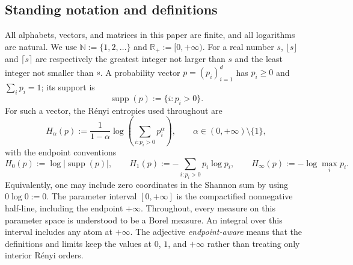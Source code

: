 \documentclass[aps,pra,11pt,onecolumn,nofootinbib,tightenlines]{revtex4-2}
\theoremstyle{definition}
\begin{document}
\subsection*{Standing notation and definitions}

All alphabets, vectors, and matrices in this paper are finite, and all
logarithms are natural.  We use
$\mathbb N:=\{1,2,\ldots\}$ and
$\mathbb R_+:=[0,+\infty)$.  For a real number $s$,
$\lfloor s\rfloor$ and $\lceil s\rceil$ are respectively the greatest integer
not larger than $s$ and the least integer not smaller than $s$.  A probability vector
$p=(p_i)_{i=1}^d$ has $p_i\geq0$ and $\sum_i p_i=1$; its support is
\begin{equation}
 \operatorname{supp}(p):=\{i:p_i>0\}.
 \label{eq:vector-support-definition}
\end{equation}
For such a vector, the R\'enyi entropies used throughout are
\begin{equation}
 H_\alpha(p):=
 \frac{1}{1-\alpha}\log\!\left(\sum_{i:p_i>0}p_i^\alpha\right),
 \qquad \alpha\in(0,+\infty)\setminus\{1\},
 \label{eq:renyi-definition-standing}
\end{equation}
with the endpoint conventions
\begin{equation}
 H_0(p):=\log|\operatorname{supp}(p)|,
 \qquad
 H_1(p):=-\sum_{i:p_i>0}p_i\log p_i,
 \qquad
 H_\infty(p):=-\log\max_i p_i.
 \label{eq:renyi-endpoints-standing}
\end{equation}
Equivalently, one may include zero coordinates in the Shannon sum by using
$0\log0:=0$.  The parameter interval $[0,+\infty]$ is the compactified
nonnegative half-line, including the endpoint $+\infty$.  Throughout, every
measure on this parameter space is understood to be a Borel measure.  An
integral over this interval includes any atom at
$+\infty$.  The adjective \emph{endpoint-aware} means that the definitions and
limits keep the values at $0$, $1$, and $+\infty$ rather than treating only
interior R\'enyi orders.
\end{document}
